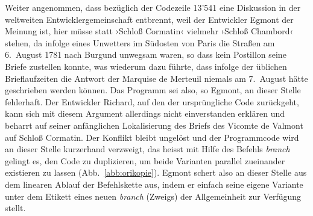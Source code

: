\documentclass[a4paper,10pt]{article}
\newcommand{\inanf}[1]{›#1‹}
\begin{document}
\begin{comment}

Warum Gefährliche Liebschaften so gut geeignet ist: Relativ in der Zeit, so kommt aber kein Programm durch. Es muss _in_ der Zeit laufen...

Es ist eine Auswahl an Briefen, d.h. es können jederzeit irgendwo noch weitere zwischengeschoben werden... Ein dynamisches Unterfangen.

\end{comment}

Weiter angenommen, dass bezüglich der Codezeile 13'541 eine Diskussion in der weltweiten Entwicklergemeinschaft entbrennt, weil der Entwickler {\color{hokkaido}Egmont} der Meinung ist, hier müsse statt \inanf{Schloß Cormatin} vielmehr \inanf{Schloß Chambord} stehen, da infolge eines Unwetters im Südosten von Paris die Straßen am 6.~August 1781 nach Burgund unwegsam waren, so dass kein Postillon seine Briefe zustellen konnte, was wiederum dazu führte, dass infolge der üblichen Brieflaufzeiten die Antwort der Marquise de Merteuil niemals am 7.~August hätte geschrieben werden können. Das Programm sei also, so {\color{hokkaido}Egmont}, an dieser Stelle fehlerhaft. Der Entwickler {\color{dzug}Richard}, auf den der ursprüngliche Code zurückgeht, kann sich mit diesem Argument allerdings nicht einverstanden erklären und beharrt auf seiner anfänglichen Lokalisierung des Briefs des Vicomte de Valmont auf Schloß Cormatin. Der Konflikt bleibt ungelöst und der Programmcode wird an dieser Stelle kurzerhand verzweigt, das heisst mit Hilfe des Befehls \emph{branch} gelingt es, den Code zu duplizieren, um beide Varianten parallel zueinander existieren zu lassen (Abb.~\ref{abb:orikopie}). {\color{hokkaido}Egmont} schert also an dieser Stelle aus dem linearen Ablauf der Befehlskette aus, indem er einfach seine eigene Variante unter dem Etikett eines neuen \emph{branch} (Zweigs) der Allgemeinheit zur Verfügung stellt.
\end{document}
